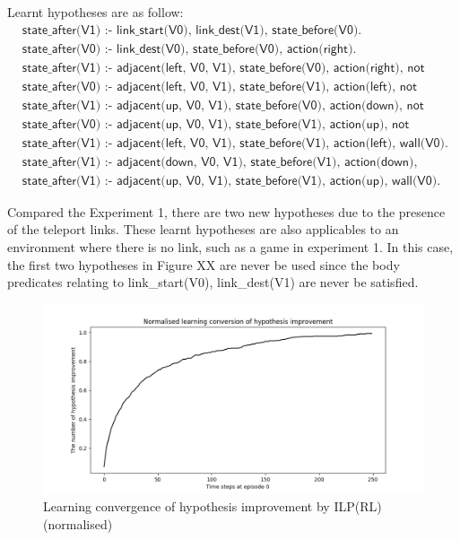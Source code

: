 Learnt hypotheses are as follow:
\begin{equation}
\begin{split}
&\textsf{state\_after(V1) :- link\_start(V0), link\_dest(V1), state\_before(V0).}\\
&\textsf{state\_after(V0) :- link\_dest(V0), state\_before(V0), action(right).}\\
&\textsf{state\_after(V1) :- adjacent(left, V0, V1), state\_before(V0), action(right), not wall(V1).}\\
&\textsf{state\_after(V0) :- adjacent(left, V0, V1), state\_before(V1), action(left), not wall(V0).}\\
&\textsf{state\_after(V1) :- adjacent(up, V0, V1), state\_before(V0), action(down), not wall(V1).}\\
&\textsf{state\_after(V0) :- adjacent(up, V0, V1), state\_before(V1), action(up), not wall(V0).}\\
&\textsf{state\_after(V1) :- adjacent(left, V0, V1), state\_before(V1), action(left), wall(V0).}\\
&\textsf{state\_after(V1) :- adjacent(down, V0, V1), state\_before(V1), action(down), wall(V0).}\\
&\textsf{state\_after(V1) :- adjacent(up, V0, V1), state\_before(V1), action(up), wall(V0).}
\end{split}
\label{experiment2_ilasp_complete}
\end{equation}

Compared the Experiment 1, there are two new hypotheses due to the presence of the teleport links.
These learnt hypotheses are also applicables to an environment where there is no link, such as a game in experiment 1.
In this case, the first two hypotheses in Figure XX are never be used since the body predicates relating to link\_start(V0), link\_dest(V1) are never be satisfied.

\begin{figure}[!htb]
\centering
\includegraphics[width=1.0\textwidth]{./figures/experiment2_ilasp}
\caption{Learning convergence of hypothesis improvement by ILP(RL) (normalised)}
\label{experiment1_test}
\end{figure}

